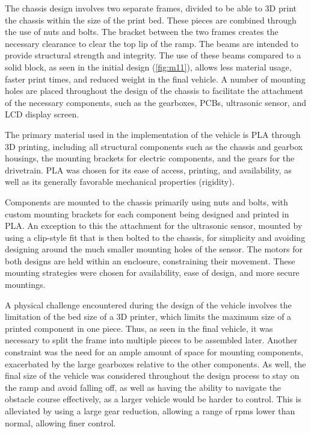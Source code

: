 \documentclass[11pt]{article}
\begin{document}
The chassis design involves two separate frames, divided to be able to 3D print the chassis within the size of the print bed. These pieces are combined through the use of nuts and bolts. The bracket between the two frames creates the necessary clearance to clear the top lip of the ramp. The beams are intended to provide structural strength and integrity. The use of these beams compared to a solid block, as seen in the initial design (\autoref{fig:m11}), allows less material usage, faster print times, and reduced weight in the final vehicle. A number of mounting holes are placed throughout the design of the chassis to facilitate the attachment of the necessary components, such as the gearboxes, PCBs, ultrasonic sensor, and LCD display screen. 

The primary material used in the implementation of the vehicle is PLA through 3D printing, including all structural components such as the chassis and gearbox housings, the mounting brackets for electric components, and the gears for the drivetrain. PLA was chosen for its ease of access, printing, and availability, as well as its generally favorable mechanical properties (rigidity). 

Components are mounted to the chassis primarily using nuts and bolts, with custom mounting brackets for each component being designed and printed in PLA. An exception to this the attachment for the ultrasonic sensor, mounted by using a clip-style fit that is then bolted to the chassis, for simplicity and avoiding designing around the much smaller mounting holes of the sensor. The motors for both designs are held within an enclosure, constraining their movement. These mounting strategies were chosen for availability, ease of design, and more secure mountings. 

A physical challenge encountered during the design of the vehicle involves the limitation of the bed size of a 3D printer, which limits the maximum size of a printed component in one piece. Thus, as seen in the final vehicle, it was necessary to split the frame into multiple pieces to be assembled later. Another constraint was the need for an ample amount of space for mounting components, exacerbated by the large gearboxes relative to the other components. As well, the final size of the vehicle was considered throughout the design process to stay on the ramp and avoid falling off, as well as having the ability to navigate the obstacle course effectively, as a larger vehicle would be harder to control. This is alleviated by using a large gear reduction, allowing a range of rpms lower than normal, allowing finer control.
\end{document}
